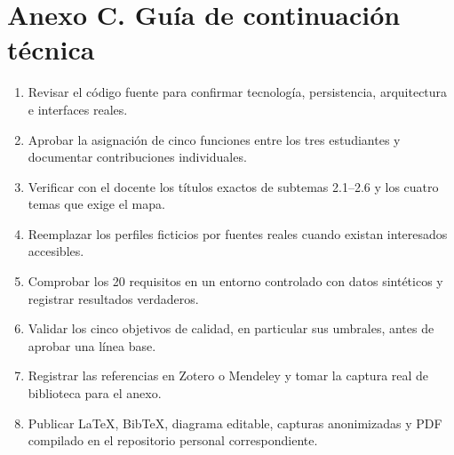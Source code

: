 \section{Anexo C. Guía de continuación técnica}
\begin{enumerate}
\item Revisar el código fuente para confirmar tecnología, persistencia, arquitectura e interfaces reales.
\item Aprobar la asignación de cinco funciones entre los tres estudiantes y documentar contribuciones individuales.
\item Verificar con el docente los títulos exactos de subtemas 2.1--2.6 y los cuatro temas que exige el mapa.
\item Reemplazar los perfiles ficticios por fuentes reales cuando existan interesados accesibles.
\item Comprobar los 20 requisitos en un entorno controlado con datos sintéticos y registrar resultados verdaderos.
\item Validar los cinco objetivos de calidad, en particular sus umbrales, antes de aprobar una línea base.
\item Registrar las referencias en Zotero o Mendeley y tomar la captura real de biblioteca para el anexo.
\item Publicar LaTeX, BibTeX, diagrama editable, capturas anonimizadas y PDF compilado en el repositorio personal correspondiente.
\end{enumerate}


